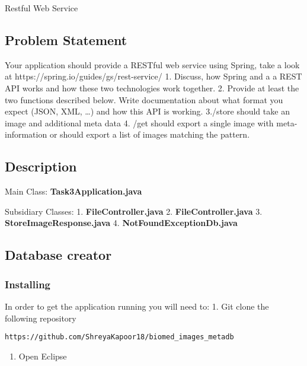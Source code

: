 Restful Web Service

\hypertarget{problem-statement}{%
\subsection{Problem Statement}\label{problem-statement}}

Your application should provide a RESTful web service using Spring, take
a look at https://spring.io/guides/gs/rest-service/ 1. Discuss, how
Spring and a a REST API works and how these two technologies work
together. 2. Provide at least the two functions described below. Write
documentation about what format you expect (JSON, XML, \ldots{}) and how
this API is working. 3./store should take an image and additional meta
data 4. /get should export a single image with meta-information or
should export a list of images matching the pattern.

\hypertarget{description}{%
\subsection{Description}\label{description}}

Main Class: \textbf{Task3Application.java}

Subsidiary Classes: 1. \textbf{FileController.java} 2.
\textbf{FileController.java} 3. \textbf{StoreImageResponse.java} 4.
\textbf{NotFoundExceptionDb.java}

\hypertarget{database-creator}{%
\subsection{Database creator}\label{database-creator}}

\hypertarget{installing}{%
\subsubsection{Installing}\label{installing}}

In order to get the application running you will need to: 1. Git clone
the following repository

\begin{verbatim}
https://github.com/ShreyaKapoor18/biomed_images_metadb
\end{verbatim}

\begin{enumerate}
\def\labelenumi{\arabic{enumi}.}
\setcounter{enumi}{1}
\tightlist
\item
  Open Eclipse
\end{enumerate}

